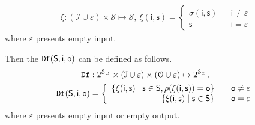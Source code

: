 \begin{equation}
\begin{split}
\xi :  (\mathcal{I}\cup\varepsilon) \times\mathcal{S} \mapsto\mathcal{S},\ \xi (\mathsf{i}, \mathsf{s})= \left\{
\begin{array}{rcl}
\sigma( \mathsf{i}, \mathsf{s})      &      & {\mathsf{i}\neq \varepsilon}\\
\mathsf{s}       &      & {\mathsf{i}= \varepsilon}
\end{array} \right. 
\end{split}
\end{equation}
where $\varepsilon$ presents empty input.

Then the ${\tt Df}( \mathsf{S},  \mathsf{i},  \mathsf{o})$ can be defined as follows.
\begin{equation}
\begin{split}
{\tt Df}&:2^{\mathcal{S}_{\mathcal{B}}}\times(\mathcal{I}\cup\varepsilon)\times(\mathcal{O}\cup\varepsilon)\mapsto2^{\mathcal{S}_{\mathcal{B}}},\\
{\tt Df}( \mathsf{S},  \mathsf{i},  \mathsf{o})&= \left\{
\begin{array}{rcl}
\{  \xi(\mathsf{i}, \mathsf{s} ) \mid  \mathsf{s} \in \mathsf{S},  \rho(\xi(\mathsf{i}, \mathsf{s} ))=\mathsf{o}\}     &      & {\mathsf{o}\neq \varepsilon}\\
\{  \xi(\mathsf{i}, \mathsf{s} ) \mid  \mathsf{s} \in \mathsf{S}\}       &      & {\mathsf{o}= \varepsilon}
\end{array} \right. 
\end{split}
\end{equation}
where  $\varepsilon$ presents empty input or empty output.

